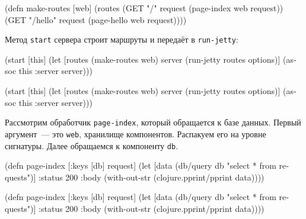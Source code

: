 \else

\begin{english}
  \begin{clojure}
(defn make-routes [web]
  (routes
   (GET "/"      request (page-index web request))
   (GET "/hello" request (page-hello web request))))
  \end{clojure}
\end{english}

\fi

\noindent
Метод \verb|start| сервера строит маршруты и передаёт в \verb|run-jetty|:

\ifx\DEVICETYPE\MOBILE

\begin{english}
  \begin{clojure}
(start [this]
  (let [routes (make-routes web)
        server (run-jetty
                 routes options)]
    (assoc this :server server)))
  \end{clojure}
\end{english}

\else

\begin{english}
  \begin{clojure}
(start [this]
  (let [routes (make-routes web)
        server (run-jetty routes options)]
    (assoc this :server server)))
  \end{clojure}
\end{english}

\fi

Рассмотрим обработчик \verb|page-index|, который обращается к базе
данных. Первый аргумент~--- это \verb|web|, хранилище компонентов. Распакуем его на
уровне сигнатуры. Далее обращаемся к компоненту \verb|db|.

\ifx\DEVICETYPE\MOBILE

\begin{english}
  \begin{clojure}
(defn page-index
  [{:keys [db]} request]
  (let [data (db/query db
               "select * from requests")]
    {:status 200
     :body (with-out-str
             (clojure.pprint/pprint
               data))}))
  \end{clojure}
\end{english}

\else

\begin{english}
  \begin{clojure}
(defn page-index
  [{:keys [db]} request]
  (let [data (db/query db "select * from requests")]
    {:status 200
     :body (with-out-str
             (clojure.pprint/pprint data))}))
  \end{clojure}
\end{english}

